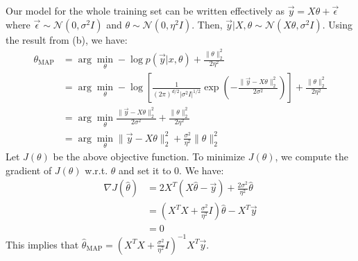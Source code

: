 \begin{answer}
Our model for the whole training set can be written effectively as $\vec{y} = X\theta + \vec{\epsilon}$ where $ \vec{\epsilon} \sim \mathcal{N}(0,\sigma^2 I) $ and $ \theta \sim \mathcal{N}(0,\eta^2 I) $. Then, $\vec{y}|X,\theta \sim \mathcal{N}(X\theta,\sigma^2 I)$. Using the result from (b), we have:
\begin{align}
	\theta_{\text{MAP}}
	&= \arg\min_{\theta} -\log p(\vec{y}|x,\theta) + \frac{\|\theta\|_2^2}{2\eta^2} \\
	&= \arg\min_{\theta} -\log \left[ \frac{1}{(2\pi)^{d/2}|\sigma^2 I|^{1/2}} \exp \left( -\frac{\|\vec{y} - X\theta\|_2^2}{2\sigma^2} \right) \right] + \frac{\|\theta\|_2^2}{2\eta^2} \\
	&= \arg\min_{\theta} \frac{\|\vec{y} - X\theta\|_2^2}{2\sigma^2} + \frac{\|\theta\|_2^2}{2\eta^2} \\
	&= \arg\min_{\theta} \|\vec{y} - X\theta\|_2^2 + \frac{\sigma^2}{\eta^2} \|\theta\|^2_2
\end{align}
Let $J(\theta)$ be the above objective function. To minimize $J(\theta)$, we compute the gradient of $J(\theta)$ w.r.t. $\theta$ and set it to 0. We have:
\begin{align}
	\nabla J(\hat\theta) 
	&= 2X^T(X\hat\theta - \vec{y}) + \frac{2\sigma^2}{\eta^2} \hat\theta \\
	&= \left( X^TX + \frac{\sigma^2}{\eta^2} I \right) \hat\theta - X^T \vec{y} \\
	&= 0
\end{align}
This implies that $\hat\theta_{\text{MAP}} = \left( X^TX + \frac{\sigma^2}{\eta^2} I \right)^{-1} X^T \vec{y}$. \\
\end{answer}
